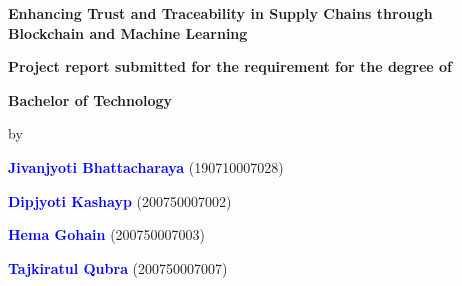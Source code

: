 
\thispagestyle{empty}
\singlespacing
\begin{titlepage}
\begin{center}
    \centering
     
      
  {{\Large \textbf{Enhancing Trust and Traceability in Supply Chains 
  through Blockchain and Machine Learning}\par}}
    \vspace{1cm}%
     
    \vspace{0.4cm}
    {
    \textbf{\large Project report submitted for the requirement for the degree of } \par}
    \vspace{0.2cm}


\vspace{0.5cm}
    {
    \textbf{\large Bachelor of Technology \\ \vspace{1mm} } \par}
    \vspace{2mm}


    

\vspace{5mm}
    {\large by\par}
    \vspace{0.05cm}
    {\large \textbf{\textcolor{blue}{Jivanjyoti Bhattacharaya}}  (190710007028)\par} 
    {\large \textbf{\textcolor{blue}{Dipjyoti Kashayp}}  (200750007002)\par} 
    {\large \textbf{\textcolor{blue}{Hema Gohain}}  (200750007003)\par} 
    {\large \textbf{\textcolor{blue}{Tajkiratul Qubra}}  (200750007007)\par} 
    \vspace{0.4cm}
    

\end{center}
\end{titlepage}
